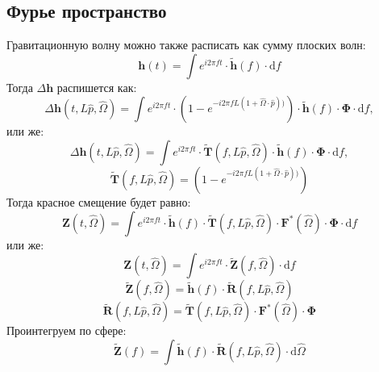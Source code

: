 \subsection{Фурье пространство}
Гравитационную волну можно также расписать как сумму плоских волн:
$$\mathbf{h}(t) = \int e^{i 2 \pi f t} \cdot \tilde{\mathbf{h}}(f) \cdot \mathrm{d} f$$
Тогда $\Delta \mathbf{h}$ распишется как:
$$\Delta \mathbf{h}(t, L\hat{p},  \hat{\Omega}) = 
\int e^{i 2 \pi f t} \cdot (1 - e^{- i 2 \pi f  L (1 + \hat{\Omega} \cdot \hat{p}))}) \cdot \tilde{\mathbf{h}}(f) \cdot \mathbf{\Phi} \cdot \mathrm{d}  f,$$
или же:
$$\Delta \mathbf{h}(t, L\hat{p},  \hat{\Omega}) = 
\int e^{i 2 \pi f t} \cdot \tilde{\mathbf{T}}(f, L\hat{p},  \hat{\Omega})\cdot \tilde{\mathbf{h}}(f) \cdot \mathbf{\Phi} \cdot \mathrm{d}  f,$$
$$\tilde{\mathbf{T}}(f, L\hat{p},  \hat{\Omega}) = (1 - e^{- i 2 \pi f  L (1 + \hat{\Omega} \cdot \hat{p}))})$$
Тогда красное смещение будет равно:
$$\mathbf{Z}(t, \hat{\Omega}) = \int e^{i 2 \pi f t} \cdot  \tilde{\mathbf{h}}(f) \cdot \tilde{\mathbf{T}}(f, L\hat{p},  \hat{\Omega}) \cdot  \mathbf{F}^{*}(\hat{\Omega}) \cdot \mathbf{\Phi} \cdot \mathrm{d} f$$
или же:
$$\mathbf{Z}(t, \hat{\Omega}) = \int e^{i 2 \pi f t} \cdot \tilde{\mathbf{Z}}(f, \hat{\Omega}) \cdot \mathrm{d} f $$
$$\tilde{\mathbf{Z}}(f, \hat{\Omega}) =  \tilde{\mathbf{h}}(f) \cdot \tilde{\mathbf{R}}(f, L\hat{p},  \hat{\Omega}) $$
$$\tilde{\mathbf{R}}(f, L\hat{p},  \hat{\Omega}) = \tilde{\mathbf{T}}(f, L\hat{p},  \hat{\Omega}) \cdot  \mathbf{F}^{*}(\hat{\Omega}) \cdot \mathbf{\Phi}  $$
Проинтегруем по сфере:
$$\tilde{\mathbf{Z}}(f) = \int  \tilde{\mathbf{h}}(f) \cdot \tilde{\mathbf{R}}(f, L\hat{p},  \hat{\Omega}) \cdot \mathrm{d} \hat{\Omega}$$

